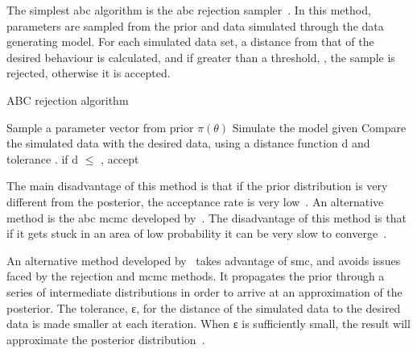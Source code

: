The simplest \acrshort{abc} algorithm is the \acrshort{abc} rejection sampler~\autocite{Pritchard:1999td}. In this method, parameters are sampled from the prior and data simulated through the data generating model. For each simulated data set, a distance from that of the desired behaviour is calculated, and if greater than a threshold, \textepsilon{}, the sample is rejected, otherwise it is accepted. 
\begin{algorithm}[H]

  \caption{ABC rejection algorithm}
 	\label{alg:ABC}
 \begin{algorithmic}[1]
    \Statex
	\State Sample a parameter vector \texttheta{} from prior $\pi(\theta)$
	\State Simulate the model given \texttheta{}
    \State Compare the simulated data with the desired data, using a distance function d and tolerance \textepsilon{}. if d $\leq$ \textepsilon{}, accept \texttheta{} 
   
  \end{algorithmic}
\end{algorithm}


\noindent The main disadvantage of this method is that if the prior distribution is very different from the posterior, the acceptance rate is very low~\autocite{Toni:2009tr}. An alternative method is the \acrshort{abc} \acrfull{mcmc} developed by~\textcite{Marjoram:2003up}. The disadvantage of this method is that if it gets stuck in an area of low probability it can be very slow to converge~\autocite{Sisson:2007il}. 

An alternative method developed by~\textcite{Toni:2009tr} takes advantage of \acrlong{smc}, and avoids issues faced by the rejection and \acrshort{mcmc} methods. It propagates the prior through a series of intermediate distributions in order to arrive at an approximation of the posterior. The tolerance, ε, for the distance of the simulated data to the desired data is made smaller at each iteration. When ε is sufficiently small, the result will approximate the posterior distribution~\autocite{Toni:2009tr}.  


